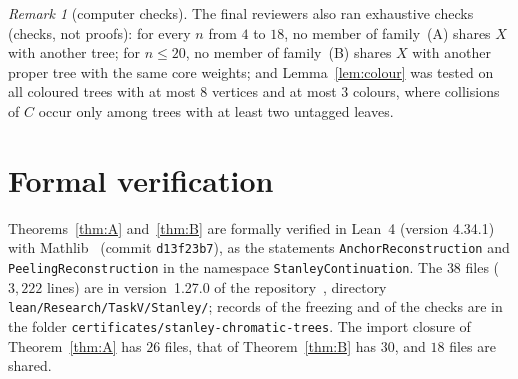 \documentclass[11pt]{article}
\theoremstyle{definition}
\theoremstyle{remark}
\newtheorem{remark}[lemma]{Remark}
\newcommand{\repoversion}{1.27.0}
\begin{document}
\begin{remark}[computer checks]\label{rem:brute}
The final reviewers also ran exhaustive checks (checks, not proofs): for every
$n$ from $4$ to $18$, no member of family~(A) shares $X$ with another tree; for
$n\le20$, no member of family~(B) shares $X$ with another proper tree with the
same core weights; and Lemma~\ref{lem:colour} was tested on all coloured trees
with at most $8$ vertices and at most $3$ colours, where collisions of $C$ occur
only among trees with at least two untagged leaves.
\end{remark}

{\sloppy
\section{Formal verification}\label{sec:lean}

Theorems~\ref{thm:A} and~\ref{thm:B} are formally verified in Lean~4 (version
4.34.1) with Mathlib~\cite{mathlib} (commit \texttt{d13f23b7}), as the
statements \texttt{AnchorReconstruction} and \texttt{PeelingReconstruction} in
the namespace \texttt{StanleyContinuation}. The $38$ files ($3{,}222$ lines) are
in version~\repoversion{} of the repository~\cite{repo}, directory
\texttt{lean/Research/TaskV/Stanley/}; records of the freezing and of the checks
are in the folder \texttt{certificates/stanley-chromatic-trees}. The import
closure of Theorem~\ref{thm:A} has $26$ files, that of Theorem~\ref{thm:B} has
$30$, and $18$ files are shared.

}
\end{document}
